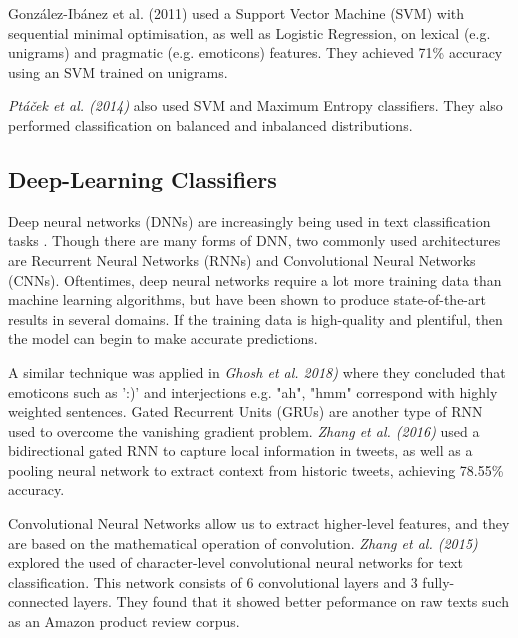 \documentclass[12pt,a4paper]{article}
\begin{document}
Gonz{\'a}lez-Ib{\'a}nez et al. (2011) \cite{gonzalez2011identifying} used a Support Vector Machine (SVM) with sequential minimal optimisation, as well as Logistic Regression, on lexical (e.g. unigrams) and pragmatic (e.g. emoticons) features. They achieved 71\% accuracy using an SVM trained on unigrams.

 \textit{Pt{\'a}{\v{c}ek et al. (2014)}} \cite{ptavcek2014sarcasm} also used SVM and Maximum Entropy classifiers. They also performed classification on balanced and inbalanced distributions.

\subsection{Deep-Learning Classifiers}\vspace{-10pt}
Deep neural networks (DNNs) are increasingly being used in text classification tasks \cite{zhang2015character, poria2016deeper}. Though there are many forms of DNN, two commonly used architectures are Recurrent Neural Networks (RNNs) and Convolutional Neural Networks (CNNs). Oftentimes, deep neural networks require a lot more training data than machine learning algorithms, but have been shown to produce state-of-the-art results in several domains. If the training data is high-quality and plentiful, then the model can begin to make accurate predictions. 




 A similar technique was applied in \textit{Ghosh et al. 2018)} \cite{ghosh2018sarcasm} where they concluded that emoticons such as ':)' and interjections e.g. "ah", "hmm" correspond with highly weighted sentences. Gated Recurrent Units (GRUs) are another type of RNN used to overcome the vanishing gradient problem.  \textit{Zhang et al. (2016)} \cite{zhang2016tweet} used a bidirectional gated RNN to capture local information in tweets, as well as a pooling neural network to extract context from historic tweets, achieving 78.55\% accuracy.

Convolutional Neural Networks allow us to extract higher-level features, and they are based on the mathematical operation of convolution. \textit{Zhang et al. (2015)}  \cite{zhang2015character} explored the used of character-level convolutional neural networks for text classification. This network consists of 6 convolutional layers and 3 fully-connected layers. They found that it showed better peformance on raw texts such as an Amazon product review corpus.
\end{document}
